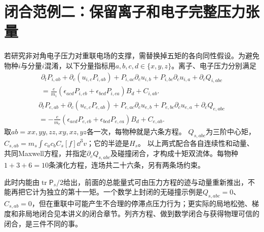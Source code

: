 \section{闭合范例二：保留离子和电子完整压力张量}
\label{hall:sec:full-ten-moment}
若研究非对角电子压力对重联电场的支撑，需替换掉五矩的各向同性假设。为避免物种$i$与分量$i$混淆，以下分量指标用$a,b,c,d\in\{x,y,z\}$。离子、电子压力分别满足
\begin{multline}
 \partial_tP_{i,ab}+\partial_c(u_{i,c}P_{i,ab})
 +P_{i,ac}\partial_cu_{i,b}+P_{i,bc}\partial_cu_{i,a}
 +\partial_cQ_{i,abc}\\
 =
 \frac e{m_i}(\epsilon_{acd}P_{i,cb}+\epsilon_{bcd}P_{i,ca})B_d
 +C_{i,ab}.
 \label{hall:eq:ion-pressure-full}
\end{multline}
\begin{multline}
 \partial_tP_{e,ab}+\partial_c(u_{e,c}P_{e,ab})
 +P_{e,ac}\partial_cu_{e,b}+P_{e,bc}\partial_cu_{e,a}
 +\partial_cQ_{e,abc}\\
 =
 -\frac e{m_e}(\epsilon_{acd}P_{e,cb}+\epsilon_{bcd}P_{e,ca})B_d
 +C_{e,ab}.
 \label{hall:eq:electron-pressure-full}
\end{multline}
取$ab=xx,yy,zz,xy,xz,yz$各一次，每物种就是六条方程。
$Q_{s,abc}$为三阶中心矩，
$C_{s,ab}=m_s\int c_ac_bC_s[f]\dd^3v$；它的半迹是$H_s$。
以上两式配合各自连续性和动量、共同Maxwell方程，并指定$\partial_cQ_{s,abc}$及碰撞闭合，才构成十矩双流体。每物种$1+3+6=10$条演化方程，连场共二十六条，另有两条场约束。

此时内能由$\operatorname{tr}\mathsf P_s/2$给出，前面的总能量式可由压力方程的迹与动量重新推出，不能再把它计为独立的第十一矩。一个数学上封闭的无碰撞示例是$Q_{s,abc}=0$、$C_{s,ab}=0$，但在重联中可能产生不合理的停滞点压力行为；更实际的局地松弛、梯度和非局地闭合见本讲义的闭合章节。列齐方程、做到数学闭合与获得物理可信的闭合，是三件不同的事。\citep{Wang2015,Ng2020}


